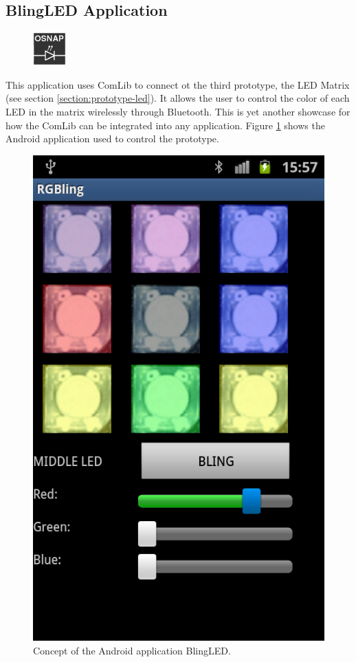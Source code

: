 \subsection{BlingLED Application}
\begin{figure}
	\centering \includegraphics[scale=1]{img/app-led}
\end{figure}
This application uses ComLib to connect ot the third prototype, the LED Matrix (see section \ref{section:prototype-led}). It allows the user to control the color of each LED in the matrix wirelessly through Bluetooth. This is yet another showcase for how the ComLib can be integrated into any application. Figure \ref{fig:design-ledmatrix} shows the Android application used to control the prototype.

\begin{figure}[h!]
	\begin{center}
	\includegraphics[scale=0.35]{img/prototype3rgBling.png}
	\end{center}
	\caption{Concept of the Android application BlingLED.}
	\label{fig:design-ledmatrix}
\end{figure}

